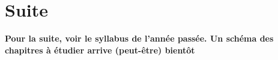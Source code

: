 
 \newpage 
 \newpage

\section{Suite}
\textbf{Pour la suite, voir le syllabus de l'année passée. Un schéma des chapitres à étudier arrive (peut-être) bientôt}